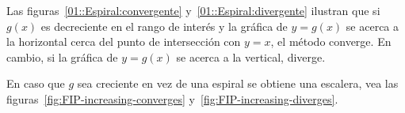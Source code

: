   Las figuras~\ref{01::Espiral:convergente} y~\ref{01::Espiral:divergente}
  ilustran que si \(g(x)\) es decreciente en el rango de interés
  y la gráfica de \(y = g(x)\) se acerca a la horizontal
  cerca del punto de intersección con \(y = x\),
  el método converge.
  En cambio,
  si la gráfica de \(y = g(x)\) se acerca a la vertical,
  diverge.

  En caso que \(g\) sea creciente en vez de una espiral
  se obtiene una escalera,
  vea las figuras~\ref{fig:FIP-increasing-converges}
  y~\ref{fig:FIP-increasing-diverges}.
  \begin{figure}
    \centering
\end{figure}
